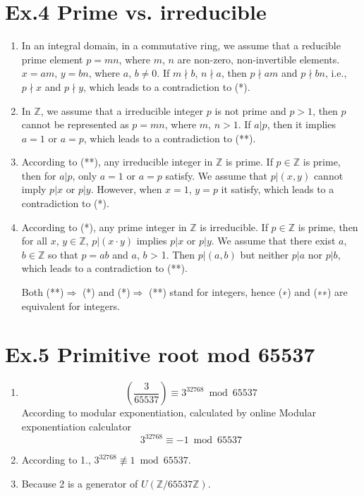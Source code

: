 \documentclass[a4paper]{article}
\begin{document}
\section*{Ex.4 Prime vs. irreducible}
	\begin{enumerate}
		\item In an integral domain, in a commutative ring, we assume that a reducible prime element $p = mn$, where $m$, $n$ are non-zero, non-invertible elements. $x = am$, $y = bn$, where $a$, $b\neq 0$. If $m\nmid b$, $n\nmid a$, then $p\nmid am$ and $p \nmid bn$, i.e., $p\nmid x$ and $p\nmid y$, which leads to a contradiction to (*).

		\item In $\mathbb{Z}$, we assume that a irreducible integer $p$ is not prime and $p > 1$, then $p$ cannot be represented as $p = mn$, where $m$, $n > 1$. If $a|p$, then it implies $a = 1$ or $a = p$, which leads to a contradiction to (**).

		\item According to (**), any irreducible integer in $\mathbb{Z}$ is prime. If $p\in \mathbb{Z}$ is prime, then for $a|p$, only $a = 1$ or $a = p$ satisfy. We assume that $p|(x,y)$ cannot imply $p|x$ or $p|y$. However, when $x = 1$, $y = p$ it satisfy, which leads to a contradiction to (*).

		\item
		According to (*), any prime integer in $\mathbb{Z}$ is irreducible. If $p\in \mathbb{Z}$ is prime, then for all $x$, $y\in \mathbb{Z}$, $p|(x\cdot y)$ implies $p|x$ or $p|y$. We assume that there exist $a$, $b\in \mathbb{Z}$ so that $p = ab$ and $a$, $b$ > 1. Then $p|(a,b)$ but neither $p|a$ nor $p|b$, which leads to a contradiction to (**).

		Both (**)$\Rightarrow$ (*) and (*)$\Rightarrow$ (**) stand for integers, hence (∗) and (∗∗) are equivalent for integers.
	\end{enumerate}

\section*{Ex.5 Primitive root mod 65537}
	\begin{enumerate}
		\item
		\[
		\left( \frac{3}{65537} \right) \equiv 3^{32768} \bmod 65537
		\]
		According to modular exponentiation, calculated by online Modular exponentiation calculator
		\[
		3^{32768} \equiv -1 \bmod 65537
		\]

		\item According to 1., $3^{32768} \not\equiv 1 \bmod  65537$.

		\item Because 2 is a generator of $U(\mathbb{Z}/65537\mathbb{Z})$.
	\end{enumerate}
\end{document}
